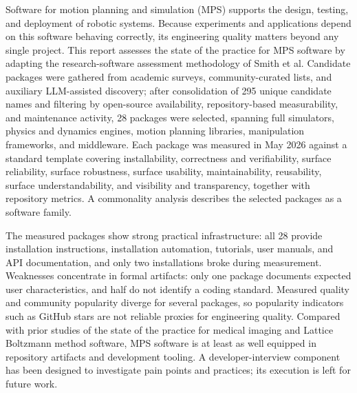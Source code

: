 

Software for motion planning and simulation (MPS) supports the design, testing,
and deployment of robotic systems. Because experiments and applications depend
on this software behaving correctly, its engineering quality matters beyond any
single project. This report assesses the state of the practice for MPS software
by adapting the research-software assessment methodology of Smith et al.
Candidate packages were gathered from academic surveys, community-curated
lists, and auxiliary LLM-assisted discovery; after consolidation of 295 unique
candidate names and filtering by open-source availability, repository-based
measurability, and maintenance activity, 28 packages were selected, spanning
full simulators, physics and dynamics engines, motion planning libraries, manipulation
frameworks, and middleware. Each package was measured in May 2026 against a standard template
covering installability, correctness and verifiability, surface reliability,
surface robustness, surface usability, maintainability, reusability, surface
understandability, and visibility and transparency, together with repository
metrics. A commonality analysis describes the selected packages as a software
family.

The measured packages show strong practical infrastructure: all 28 provide
installation instructions, installation automation, tutorials, user manuals,
and API documentation, and only two installations broke during measurement.
Weaknesses concentrate in formal artifacts: only one package documents expected
user characteristics, and half do not identify a coding standard. Measured
quality and community popularity diverge for several packages, so popularity
indicators such as GitHub stars are not reliable proxies for engineering
quality. Compared with prior studies of the state of the practice for medical imaging
and Lattice Boltzmann method software, MPS software is at least as well
equipped in repository artifacts and development tooling. A developer-interview
component has been designed to investigate pain points and practices; its
execution is left for future work.
